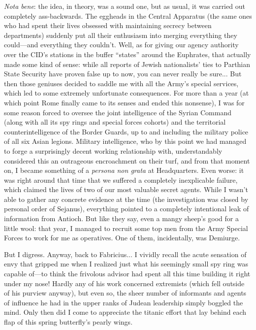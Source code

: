 \emph{Nota bene}: the idea, in theory, was a sound one, but as usual, it was carried out completely ass-backwards. The eggheads in the Central Apparatus (the same ones who had spent their lives obsessed with maintaining secrecy between departments) suddenly put all their enthusiasm into merging everything they could---and everything they couldn't. Well, as for giving our agency authority over the CID's stations in the buffer ``states'' around the Euphrates, that actually made some kind of sense: while all reports of Jewish nationalists' ties to Parthian State Security have proven false up to now, you can never really be sure... But then those geniuses decided to saddle me with all the Army's special services, which led to some extremely unfortunate consequences. For more than a year (at which point Rome finally came to its senses and ended this nonsense), I was for some reason forced to oversee the joint intelligence of the Syrian Command (along with all its spy rings and special forces cohorts) and the territorial counterintelligence of the Border Guards, up to and including the military police of all six Asian legions. Military intelligence, who by this point we had managed to forge a surprisingly decent working relationship with, understandably considered this an outrageous encroachment on their turf, and from that moment on, I became something of a \emph{persona non grata} at Headquarters. Even worse: it was right around that time that we suffered a completely inexplicable failure, which claimed the lives of two of our most valuable secret agents. While I wasn't able to gather any concrete evidence at the time (the investigation was closed by personal order of Sejanus), everything pointed to a completely intentional leak of information from Antioch. But like they say, even a mangy sheep's good for a little wool: that year, I managed to recruit some top men from the Army Special Forces to work for me as operatives. One of them, incidentally, was Demiurge.

But I digress. Anyway, back to Fabricius... I vividly recall the acute sensation of envy that gripped me when I realized just what his seemingly small spy ring was capable of---to think the frivolous advisor had spent all this time building it right under my nose! Hardly any of his work concerned extremists (which fell outside of his purview anyway), but even so, the sheer number of informants and agents of influence he had in the upper ranks of Judean leadership simply boggled the mind. Only then did I come to appreciate the titanic effort that lay behind each flap of this spring butterfly's pearly wings.

